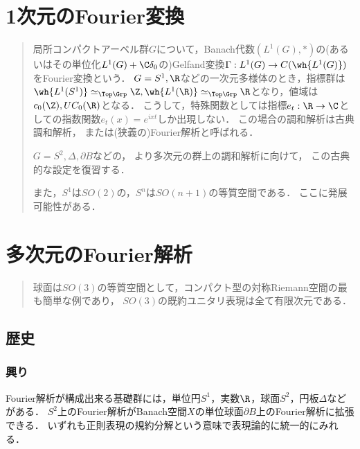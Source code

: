 \documentclass[uplatex,dvipdfmx]{jsreport}
\begin{document}
\chapter{1次元のFourier変換}

\begin{quotation}
    局所コンパクトアーベル群$G$について，Banach代数$(L^1(G),*)$の(あるいはその単位化$L^1(G)+\C\delta_0$の)Gelfand変換$\Gamma:L^1(G)\to C(\wh{L^1(G)})$をFourier変換という．
    $G=S^1,\R$などの一次元多様体のとき，指標群は$\wh{L^1(S^1)}\simeq_{\Top\Grp}\Z,\wh{L^1(\R)}\simeq_{\Top\Grp}\R$となり，値域は$c_0(\Z),UC_0(\R)$となる．
    こうして，特殊関数としては指標$e_t:\R\to\C$としての指数関数$e_t(x)=e^{ixt}$しか出現しない．
    この場合の調和解析は古典調和解析，
    または(狭義の)Fourier解析と呼ばれる．

    $G=S^2,\Delta,\partial B$などの，
    より多次元の群上の調和解析に向けて，
    この古典的な設定を復習する．

    また，$S^1$は$SO(2)$の，$S^n$は$SO(n+1)$の等質空間である．
    ここに発展可能性がある．
\end{quotation}

\chapter{多次元のFourier解析}

\begin{quotation}
    球面は$SO(3)$の等質空間として，コンパクト型の対称Riemann空間の最も簡単な例であり，
    $SO(3)$の既約ユニタリ表現は全て有限次元である．
\end{quotation}

\section{歴史}

\subsection{興り}

\begin{tcolorbox}[colframe=ForestGreen, colback=ForestGreen!10!white,breakable,colbacktitle=ForestGreen!40!white,coltitle=black,fonttitle=\bfseries\sffamily,
title=]
    Fourier解析が構成出来る基礎群には，単位円$S^1$，実数$\R$，球面$S^2$，円板$\Delta$などがある．
    $S^2$上のFourier解析がBanach空間$X$の単位球面$\partial B$上のFourier解析に拡張できる．
    いずれも正則表現の規約分解という意味で表現論的に統一的にみれる．
\end{tcolorbox}
\end{document}
